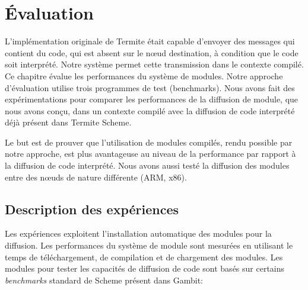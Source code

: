 \def \MMM[#1]{\textit{\normalsize M\footnotesize\raisebox{-0.8ex}{#1}}}

\chapter{Évaluation}
\label{ch:evaluation}

L'implémentation originale de Termite était capable d'envoyer des messages qui
contient du code, qui est absent sur le nœud destination, à condition que le
code soit interprété. Notre système permet cette transmission dans le contexte
compilé.  Ce chapitre évalue les performances du système de modules.  Notre
approche d'évaluation utilise trois programmes de test (benchmarks). Nous avons
fait des expérimentations pour comparer les performances de la diffusion de
module, que nous avons conçu, dans un contexte compilé avec la diffusion de
code interprété déjà présent dans Termite Scheme.

Le but est de prouver que l'utilisation de modules compilés, rendu possible par
notre approche, est plus avantageuse au niveau de la performance par rapport à
la diffusion de code interprété. Nous avons aussi testé la diffusion des modules
entre des nœuds de nature différente (ARM, x86).





\section{Description des expériences}

Les expériences exploitent l'installation automatique des modules pour la
diffusion.  Les performances du système de module sont mesurées en utilisant le
temps de téléchargement, de compilation et de chargement des modules. Les
modules pour tester les capacités de diffusion de code sont basés sur certains
\textit{benchmarks} standard de Scheme présent dans Gambit:

